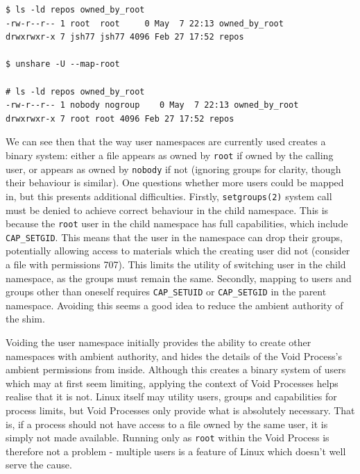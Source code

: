 \documentclass[a4paper,12pt,twoside,openright]{report}
\begin{document}
\begin{lstlisting}[float,label={lst:mapped-root-directory}]
$ ls -ld repos owned_by_root
-rw-r--r-- 1 root  root     0 May  7 22:13 owned_by_root
drwxrwxr-x 7 jsh77 jsh77 4096 Feb 27 17:52 repos

$ unshare -U --map-root

# ls -ld repos owned_by_root
-rw-r--r-- 1 nobody nogroup    0 May  7 22:13 owned_by_root
drwxrwxr-x 7 root root 4096 Feb 27 17:52 repos
\end{lstlisting}

We can see then that the way user namespaces are currently used creates a binary system: either a file appears as owned by \texttt{root} if owned by the calling user, or appears as owned by \texttt{nobody} if not (ignoring groups for clarity, though their behaviour is similar). One questions whether more users could be mapped in, but this presents additional difficulties. Firstly, \texttt{setgroups(2)} system call must be denied to achieve correct behaviour in the child namespace. This is because the \texttt{root} user in the child namespace has full capabilities, which include \texttt{CAP\_SETGID}. This means that the user in the namespace can drop their groups, potentially allowing access to materials which the creating user did not (consider a file with permissions 707). This limits the utility of switching user in the child namespace, as the groups must remain the same. Secondly, mapping to users and groups other than oneself requires \texttt{CAP\_SETUID} or \texttt{CAP\_SETGID} in the parent namespace. Avoiding this seems a good idea to reduce the ambient authority of the shim.

Voiding the user namespace initially provides the ability to create other namespaces with ambient authority, and hides the details of the Void Process's ambient permissions from inside. Although this creates a binary system of users which may at first seem limiting, applying the context of Void Processes helps realise that it is not. Linux itself may utility users, groups and capabilities for process limits, but Void Processes only provide what is absolutely necessary. That is, if a process should not have access to a file owned by the same user, it is simply not made available. Running only as \texttt{root} within the Void Process is therefore not a problem - multiple users is a feature of Linux which doesn't well serve the cause.
\end{document}
